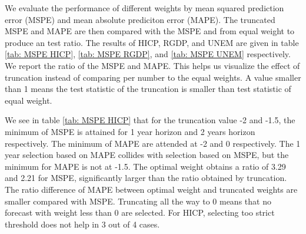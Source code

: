 \documentclass[11pt]{article}
\begin{document}
We evaluate the performance of different weights by mean squared
prediction error (MSPE) and mean absolute prediciton error (MAPE). The truncated MSPE and MAPE are then compared with the
MSPE and from equal weight to produce an test ratio. The results of HICP, RGDP, and UNEM are given in
table \ref{tab: MSPE HICP}, \ref{tab: MSPE RGDP}, and
\ref{tab: MSPE UNEM} respectively. We report the ratio of the MSPE and MAPE. This helps us visualize the effect of truncation instead of comparing per number to the equal weights. A value smaller than 1 means the test statistic of the truncation is smaller than test statistic of equal weight.

We see in table \ref{tab: MSPE HICP} that for the truncation value -2 and -1.5, the minimum of MSPE is attained for 1 year horizon and 2 years horizon respectively. The minimum of MAPE are attended at -2 and 0 respectively. The 1 year selection based on MAPE collides with selection based on MSPE, but the minimum for MAPE is not at -1.5. The optimal weight obtains a ratio of 3.29 and 2.21 for MSPE, significantly larger than the ratio obtained by truncation. The ratio difference of MAPE between optimal weight and truncated weights are smaller compared with MSPE. Truncating all the way to 0 means that no forecast with weight less than 0 are selected. For HICP, selecting too strict threshold does not help in 3 out of 4 cases.
\end{document}

